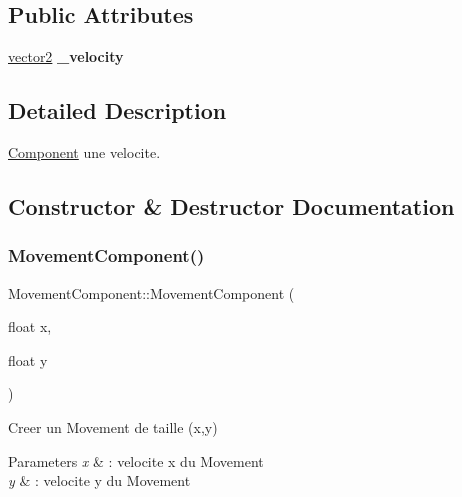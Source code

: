 \subsection*{Public Attributes}
\begin{DoxyCompactItemize}
\item 
\hypertarget{class_movement_component_aedea2037e7a30160bc7f847055b08088}{}\label{class_movement_component_aedea2037e7a30160bc7f847055b08088} 
\hyperlink{structvector2}{vector2} {\bfseries \+\_\+velocity}
\end{DoxyCompactItemize}


\subsection{Detailed Description}
\hyperlink{class_component}{Component} une velocite. 

\subsection{Constructor \& Destructor Documentation}
\hypertarget{class_movement_component_a2fa2f87c3e4cdc69489e5ce06a131fd1}{}\label{class_movement_component_a2fa2f87c3e4cdc69489e5ce06a131fd1} 
\subsubsection{\texorpdfstring{Movement\+Component()}{MovementComponent()}\hspace{0.1cm}{\footnotesize\ttfamily [1/2]}}
{\footnotesize\ttfamily Movement\+Component\+::\+Movement\+Component (\begin{DoxyParamCaption}\item[{float}]{x,  }\item[{float}]{y }\end{DoxyParamCaption})\hspace{0.3cm}{\ttfamily [inline]}}



Creer un Movement de taille (x,y) 


\begin{DoxyParams}{Parameters}
{\em x} & \+: velocite x du Movement \\
\hline
{\em y} & \+: velocite y du Movement \\
\hline
\end{DoxyParams}
\hypertarget{class_movement_component_ac9432753c0b29b1206e04c139e56c757}{}\label{class_movement_component_ac9432753c0b29b1206e04c139e56c757} 
